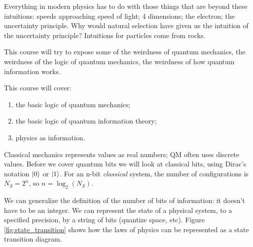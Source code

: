 \documentclass[]{article}
\begin{document}
Everything in modern physics has to do with those things that are beyond these intuitions: speeds approaching speed of light; 4 dimensions; the electron; the uncertainty principle. Why would natural selection have given us the intuition of the uncertainty principle? Intuitions for particles come from rocks.

This course will try to expose some of the weirdness of quantum mechanics, the weirdness of the logic of quantum mechanics, the weirdness of how quantum information works. 

This course will cover:
\begin{enumerate}
	\item the basic logic of quantum mechanics;
	\item the basic logic of quantum information theory;
	\item physics as information.
\end{enumerate}

Classical mechanics represents values as real numbers; QM often uses discrete values. Before we cover quantum bits we will look at classical bits, using Dirac's notation $\ket{0}$ or $\ket{1}$. For an n-bit \emph{classical} system, the number of configurations is $N_S=2^n$, so $n=\log_2(N_S)$.

We can generalize the definition of the number of bits of information: it doesn't have to be an integer. We can represent the state of a physical system, to a specified precision, by a string of bits (quantize space, etc). Figure \ref{fig:state_transition} shows how the laws of physics can be represented as a state transition diagram.
\end{document}
